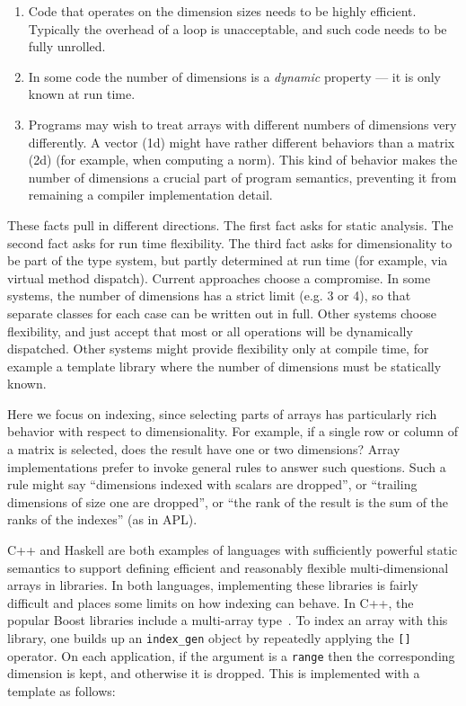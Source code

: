 \begin{enumerate}
\item Code that operates on the dimension sizes needs to be highly efficient.
Typically the overhead of a loop is unacceptable, and such code needs to be fully
unrolled.
\item In some code the number of dimensions is a \emph{dynamic} property --- it is
only known at run time.
\item Programs may wish to treat arrays with different numbers of dimensions very
differently.
A vector (1d) might have rather different behaviors than a matrix (2d)
(for example, when computing a norm).
This kind of behavior makes the number of dimensions a crucial part of program
semantics, preventing it from remaining a compiler implementation detail.
\end{enumerate}

These facts pull in different directions.
The first fact asks for static analysis.
The second fact asks for run time flexibility.
The third fact asks for dimensionality to be part of the type system, but
partly determined at run time (for example, via virtual method dispatch).
Current approaches choose a compromise.
In some systems, the number of dimensions has a strict limit (e.g. 3 or 4),
so that separate classes for each case can be written out in full.
Other systems choose flexibility, and just accept that most
or all operations will be dynamically dispatched.
Other systems might provide flexibility only at compile time, for example a
template library where the number of dimensions must be statically known.

Here we focus on indexing, since selecting parts of arrays has particularly
rich behavior with respect to dimensionality.
For example, if a single row or column of a matrix is
selected, does the result have one or two dimensions?
Array implementations prefer to invoke general rules to answer such questions.
Such a rule might say ``dimensions indexed with scalars are dropped'', or ``trailing
dimensions of size one are dropped'', or ``the rank of the result
is the sum of the ranks of the indexes'' (as in APL).

C++ and Haskell are both examples of languages with sufficiently powerful
static semantics to support defining efficient and reasonably flexible
multi-dimensional arrays in libraries.
In both languages, implementing these libraries is fairly difficult and
places some limits on how indexing can behave.
In C++, the popular Boost libraries include a multi-array
type~\cite{garcia2005multiarray}.
To index an array with this library, one builds up an \texttt{index\_gen}
object by repeatedly applying the \texttt{[]} operator.
On each application, if the argument is a \texttt{range} then the
corresponding dimension is kept, and otherwise it is dropped.
This is implemented with a template as follows:


